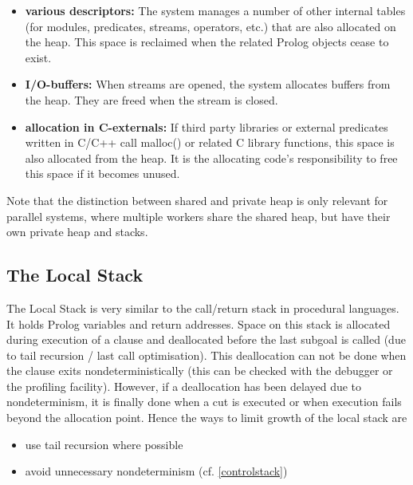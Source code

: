 \begin{itemize}
\item {\bf various descriptors:}
The system manages a number of other internal tables (for modules, predicates,
streams, operators, etc.) that are also allocated on the heap.
This space is reclaimed when the related Prolog objects cease to exist.
\item {\bf I/O-buffers:}
When streams are opened, the system allocates buffers from the
heap. They are freed when the stream is closed.
\item {\bf allocation in C-externals:}
If third party libraries or external predicates written in C/C++ call
malloc() or related C library functions, this space is also allocated
from the heap.  It is the allocating code's responsibility to free
this space if it becomes unused.
\end{itemize}
Note that the distinction between shared and private heap is only relevant for
parallel \eclipse{} systems, where multiple workers share the shared
heap, but have their own private heap and stacks.


\subsection{The Local Stack}
The Local Stack is very similar to the call/return stack in procedural
languages.
It holds Prolog variables and return addresses.
Space on this stack is allocated during execution of a clause and deallocated
before the last subgoal is called (due to tail recursion / last call
optimisation).
This deallocation can not be done when the clause exits nondeterministically
(this can be checked with the debugger or the profiling facility).
However, if a deallocation has been delayed due to nondeterminism, it is
finally done when a cut is executed or when execution fails beyond
the allocation point.
Hence the ways to limit growth of the local stack are
\begin{itemize}
\item use tail recursion where possible
\item avoid unnecessary nondeterminism (cf. \ref{controlstack})
\end{itemize}



